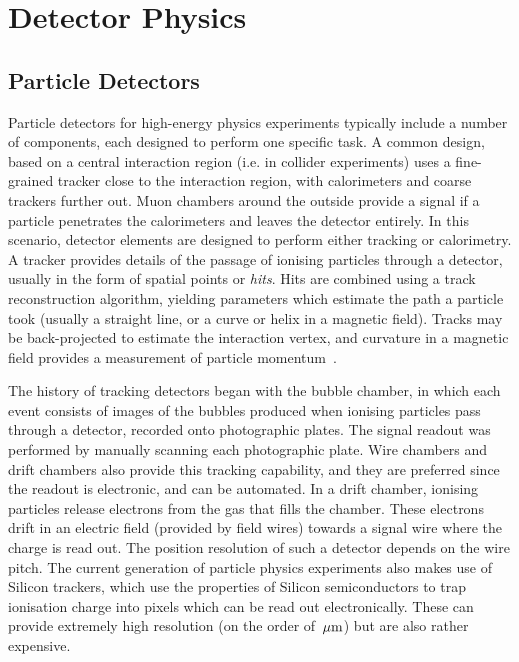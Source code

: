\chapter{Detector Physics}\label{chapter:DetectorPhysics}
\section{Particle Detectors}
Particle detectors for high-energy physics experiments typically include a number of components, each designed to perform one specific task. A common design, based on a central interaction region (i.e. in collider experiments) uses a fine-grained tracker close to the interaction region, with calorimeters and coarse trackers further out. Muon chambers around the outside provide a signal if a particle penetrates the calorimeters and leaves the detector entirely. In this scenario, detector elements are designed to perform either tracking or calorimetry. A tracker provides details of the passage of ionising particles through a detector, usually in the form of spatial points or \emph{hits}. Hits are combined using a track reconstruction algorithm, yielding parameters which estimate the path a particle took (usually a straight line, or a curve or helix in a magnetic field). Tracks may be back-projected to estimate the interaction vertex, and curvature in a magnetic field provides a measurement of particle momentum~\citep{Green2008}. 

The history of tracking detectors began with the bubble chamber, in which each event consists of images of the bubbles produced when ionising particles pass through a detector, recorded onto photographic plates. The signal readout was performed by manually scanning each photographic plate. Wire chambers and drift chambers also provide this tracking capability, and they are preferred since the readout is electronic, and can be automated. In a drift chamber, ionising particles release electrons from the gas that fills the chamber. These electrons drift in an electric field (provided by field wires) towards a signal wire where the charge is read out. The position resolution of such a detector depends on the wire pitch. The current generation of particle physics experiments also makes use of Silicon trackers, which use the properties of Silicon semiconductors to trap ionisation charge into pixels which can be read out electronically. These can provide extremely high resolution (on the order of $\,\mu\mathrm{m}$) but are also rather expensive.

